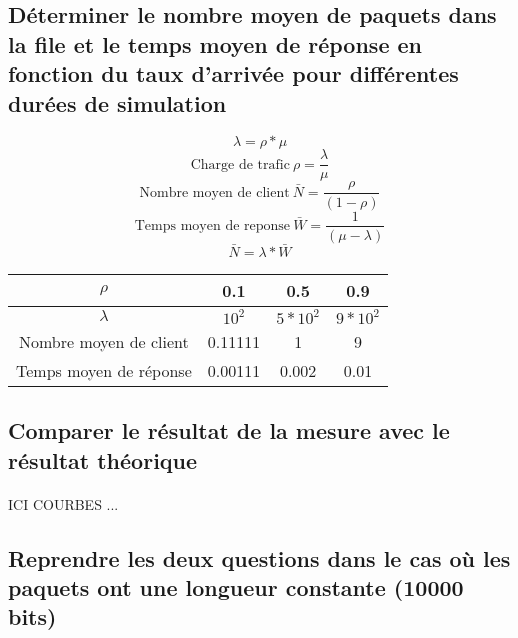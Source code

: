         \subsection{Déterminer le nombre moyen de paquets dans la file et le temps moyen de réponse en fonction du taux d'arrivée pour différentes durées de simulation}
\[  \lambda = \rho * \mu \]
\[  \text{Charge de trafic} \ \rho = \frac{\lambda}{\mu} \]
\[  \text{Nombre moyen de client} \ \bar{N} = \frac{\rho}{(1 - \rho)} \]
\[  \text{Temps moyen de reponse} \ \bar{W} = \frac{1}{(\mu - \lambda)} \]
\[  \bar{N} = \lambda * \bar{W} \]
\begin{center}
    \begin{tabular}{ | c | c| c | c | }
        \hline
            $\rho$ & 0.1 & 0.5 & 0.9 \\
        \hline
            $\lambda$ & $10^{2}$ & $5*10^{2}$ & $9*10^{2}$ \\
        \hline
            Nombre moyen de client & 0.11111 & 1 & 9 \\
        \hline
            Temps moyen de réponse & 0.00111 & 0.002 & 0.01 \\
        \hline
    \end{tabular}
\end{center}
%
        \subsection{Comparer le résultat de la mesure avec le résultat théorique}
            \paragraph{}
ICI COURBES ...
%
        \subsection{Reprendre les deux questions dans le cas où les paquets ont une longueur constante (10000 bits)}
%
